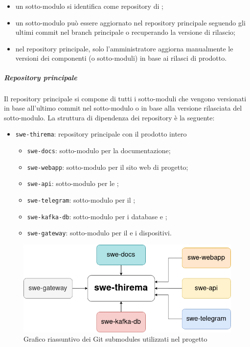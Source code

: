 		\begin{itemize}
			\item un sotto-modulo si identifica come repository di ;
			\item un sotto-modulo può essere aggiornato nel repository principale seguendo gli ultimi commit nel branch principale o recuperando la versione di rilascio;
			\item nel repository principale, solo l'amministratore aggiorna manualmente le versioni dei componenti (o sotto-moduli) in base ai rilasci di prodotto.
		\end{itemize}

		\subparagraph{Repository principale}

		Il repository principale si compone di tutti i sotto-moduli che vengono versionati in base all'ultimo commit nel sotto-modulo o in base alla versione rilasciata del sotto-modulo.
		\newline
		La struttura di dipendenza dei repository è la seguente:

		\begin{itemize}
			\item \verb!swe-thirema!: repository principale con il prodotto intero
			\begin{itemize}
				\item \verb!swe-docs!: sotto-modulo per la documentazione;
				\item \verb!swe-webapp!: sotto-modulo per il sito web di progetto;
				\item \verb!swe-api!: sotto-modulo per le ;
				\item \verb!swe-telegram!: sotto-modulo per il ;
				\item \verb!swe-kafka-db!: sotto-modulo per i database e ;
				\item \verb!swe-gateway!: sotto-modulo per il  e i dispositivi.
			\end{itemize}
		\end{itemize}

		\begin{figure}[H]
			\centering
			\includegraphics[scale=0.7]{res/images/submodules}
			\caption{Grafico riassuntivo dei Git submodules utilizzati nel progetto}
		\end{figure}
		
